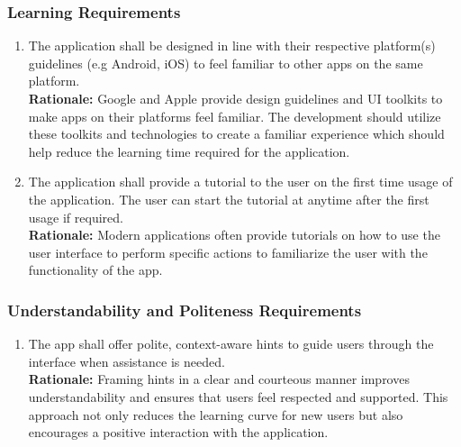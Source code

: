 \documentclass[]{article}
\begin{document}
\subsubsection{Learning Requirements}
\label{ssub:learning_requirements}
\begin{enumerate}[{UH-L}1. ]
	\item The application shall be designed in line with their respective platform(s) guidelines (e.g Android, iOS) to feel familiar to other apps on the same platform.\\
	\textbf{Rationale:} Google and Apple provide design guidelines and UI toolkits to make apps on their platforms feel familiar. The development should utilize these toolkits
	and technologies to create a familiar experience which should help reduce the learning time required for the application.
	\item The application shall provide a tutorial to the user on the first time usage of the application. The user can start the tutorial at anytime after the first usage if required.\\
	\textbf{Rationale:} Modern applications often provide tutorials on how to use the user interface to perform specific actions to familiarize the user with the functionality of the app.
\end{enumerate}

\subsubsection{Understandability and Politeness Requirements}
\label{ssub:understandability_and_politeness_requirements}
\begin{enumerate}[{UH-UP}1. ]
	\item The app shall offer polite, context-aware hints to guide users through the interface when assistance is needed.\\
	\textbf{Rationale:} Framing hints in a clear and courteous manner improves understandability and ensures that users feel respected and supported. This approach not only reduces the learning curve for new users but also encourages a positive interaction with the application.
\end{enumerate}
\end{document}
